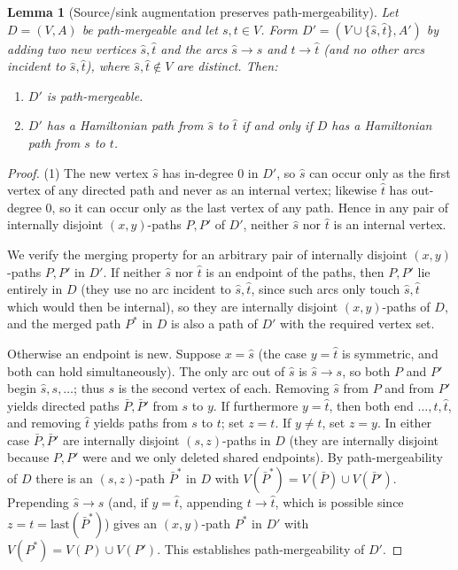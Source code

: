 \documentclass[12pt]{article}
\newtheorem{lemma}{Lemma}
\theoremstyle{definition}
\newcommand{\Vv}{V}
\newcommand{\Aa}{A}
\begin{document}
\begin{lemma}[Source/sink augmentation preserves path-mergeability]\label{lem:source}
Let $D=(\Vv,\Aa)$ be path-mergeable and let $s,t\in\Vv$. Form
$D'=(\Vv\cup\{\hat s,\hat t\},\Aa')$ by adding two new vertices $\hat s,\hat t$ and
the arcs $\hat s\to s$ and $t\to\hat t$ (and no other arcs incident to
$\hat s,\hat t$), where $\hat s,\hat t\notin\Vv$ are distinct. Then:
\begin{enumerate}
\item $D'$ is path-mergeable.
\item $D'$ has a Hamiltonian path from $\hat s$ to $\hat t$ if and only if $D$ has
a Hamiltonian path from $s$ to $t$.
\end{enumerate}
\end{lemma}

\begin{proof}
(1) The new vertex $\hat s$ has in-degree $0$ in $D'$, so $\hat s$ can occur only
as the first vertex of any directed path and never as an internal vertex; likewise
$\hat t$ has out-degree $0$, so it can occur only as the last vertex of any path.
Hence in any pair of internally disjoint $(x,y)$-paths $P,P'$ of $D'$, neither
$\hat s$ nor $\hat t$ is an internal vertex.

We verify the merging property for an arbitrary pair of internally disjoint
$(x,y)$-paths $P,P'$ in $D'$. If neither $\hat s$ nor $\hat t$ is an endpoint of
the paths, then $P,P'$ lie entirely in $D$ (they use no arc incident to
$\hat s,\hat t$, since such arcs only touch $\hat s,\hat t$ which would then be
internal), so they are internally disjoint $(x,y)$-paths of $D$, and the merged
path $P^{*}$ in $D$ is also a path of $D'$ with the required vertex set.

Otherwise an endpoint is new. Suppose $x=\hat s$ (the case $y=\hat t$ is symmetric,
and both can hold simultaneously). The only arc out of $\hat s$ is $\hat s\to s$,
so both $P$ and $P'$ begin $\hat s,s,\dots$; thus $s$ is the second vertex of each.
Removing $\hat s$ from $P$ and from $P'$ yields directed paths $\bar P,\bar P'$ from
$s$ to $y$. If furthermore $y=\hat t$, then both end $\dots,t,\hat t$, and removing
$\hat t$ yields paths from $s$ to $t$; set $z=t$. If $y\neq\hat t$, set $z=y$. In
either case $\bar P,\bar P'$ are internally disjoint $(s,z)$-paths in $D$ (they are
internally disjoint because $P,P'$ were and we only deleted shared endpoints). By
path-mergeability of $D$ there is an $(s,z)$-path $\bar P^{*}$ in $D$ with
$V(\bar P^{*})=V(\bar P)\cup V(\bar P')$. Prepending $\hat s\to s$ (and, if
$y=\hat t$, appending $t\to\hat t$, which is possible since $z=t=\mathrm{last}
(\bar P^{*})$) gives an $(x,y)$-path $P^{*}$ in $D'$ with
$V(P^{*})=V(P)\cup V(P')$. This establishes path-mergeability of $D'$.


\end{proof}
\end{document}
